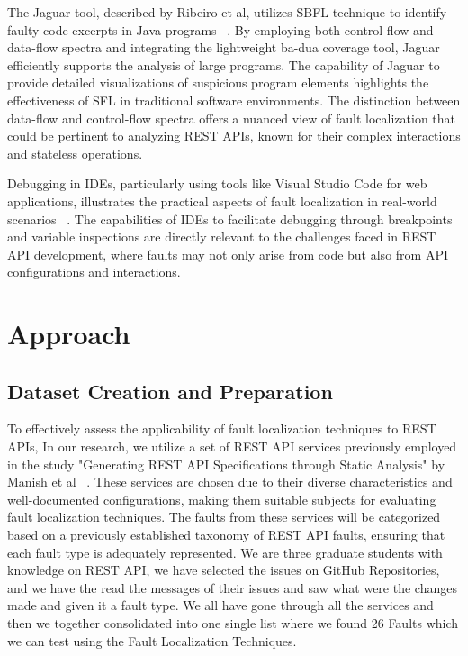 \documentclass[conference]{IEEEtran}
\begin{document}
The Jaguar tool, described by Ribeiro et al, utilizes SBFL technique to identify faulty code excerpts in Java programs ~\cite{8367068}. By employing both control-flow and data-flow spectra and integrating the lightweight ba-dua coverage tool, Jaguar efficiently supports the analysis of large programs. The capability of Jaguar to provide detailed visualizations of suspicious program elements highlights the effectiveness of SFL in traditional software environments. The distinction between data-flow and control-flow spectra offers a nuanced view of fault localization that could be pertinent to analyzing REST APIs, known for their complex interactions and stateless operations.

Debugging in IDEs, particularly using tools like Visual Studio Code for web applications, illustrates the practical aspects of fault localization in real-world scenarios ~\cite{DebuggingCode}. The capabilities of IDEs to facilitate debugging through breakpoints and variable inspections are directly relevant to the challenges faced in REST API development, where faults may not only arise from code but also from API configurations and interactions.





\section{Approach}
\label{sec:approach}

\subsection{Dataset Creation and Preparation}

To effectively assess the applicability of fault localization techniques to REST APIs, In our research, we utilize a set of REST API services previously employed in the study "Generating REST API Specifications through Static Analysis" by Manish et al ~\cite{ManishRestServices}. These services are chosen due to their diverse characteristics and well-documented configurations, making them suitable subjects for evaluating fault localization techniques. 
The faults from these services will be categorized based on a previously established taxonomy of REST API faults, ensuring that each fault type is adequately represented. We are three graduate students with knowledge on REST API, we have selected the issues on GitHub Repositories, and we have the read the messages of their issues and saw what were the changes made and given it a fault type. We all have gone through all the services and then we together consolidated into one single list where we found 26 Faults which we can test using the Fault Localization Techniques. 
\end{document}
